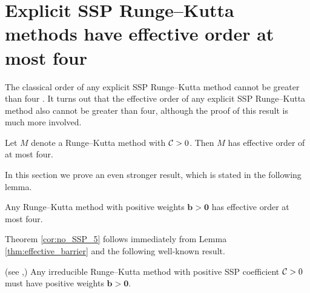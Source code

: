 \section{Explicit SSP Runge--Kutta methods have effective order at most four}\label{sec:ExRK_barrier}
The classical order of any explicit SSP Runge--Kutta method cannot be greater
than four \cite{Ruuth2002}.
It turns out that the effective order of any explicit SSP Runge--Kutta method 
also cannot be greater than four, although the proof of this result is much more
involved.  
\begin{theorem}\label{cor:no_SSP_5}
    Let $M$ denote a Runge--Kutta method with $\mathcal{C}>0$.
    Then $M$ has effective order of at most four.
\end{theorem}

In this section we prove an even stronger result,
which is stated in the following lemma.
\begin{lemma}\label{thm:effective_barrier}
	Any Runge--Kutta method with positive weights $\bm{b} > \bm{0}$
        has effective order at most four.
\end{lemma}

Theorem \ref{cor:no_SSP_5} follows immediately from Lemma \ref{thm:effective_barrier}
and the following well-known result.
\begin{lemma}\label{lem:positive_b}(see \cite[Theorem~4.2]{Kraaijevanger1991},\cite[Lemma 4.2]{Ruuth2002})
	Any irreducible Runge--Kutta method with positive SSP coefficient $\mathcal{C}>0$
	must have positive weights $\bm{b} > \bm{0}$.
\end{lemma}

